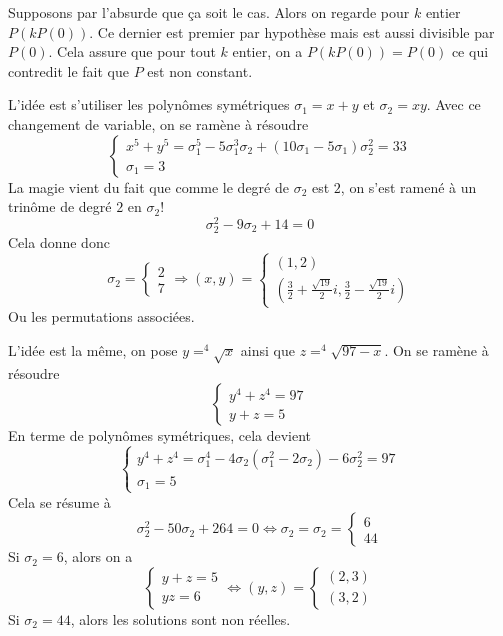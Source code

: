 \begin{sol}
Supposons par l'absurde que ça soit le cas. Alors on regarde pour $k$ entier $P(kP(0))$. Ce dernier est premier par hypothèse mais est aussi divisible par $P(0)$. Cela assure que pour tout $k$ entier, on a $P(kP(0))=P(0)$ ce qui contredit le fait que $P$ est non constant.
\end{sol}

\begin{sol}
L'idée est s'utiliser les polynômes symétriques $\sigma_1=x+y$ et $\sigma_2=xy$. Avec ce changement de variable, on se ramène à résoudre
$$\left \{
\begin{array}{rcl}
x^5+y^5=\sigma_1^5-5\sigma_1^3\sigma_2+(10\sigma_1-5\sigma_1)\sigma_2^2=33 \\
\sigma_1=3
\end{array}
\right. $$
La magie vient du fait que comme le degré de $\sigma_2$ est $2$, on s'est ramené à un trinôme de degré $2$ en $\sigma_2!$
$$\sigma_2^2-9\sigma_2+14=0 $$
Cela donne donc 
$$\sigma_2=\left \{
\begin{array}{rcl}
2 \\
7
\end{array}
\right. \Rightarrow (x,y)=\left \{
\begin{array}{rcl}
(1,2) \\
\left(\frac{3}{2}+\frac{\sqrt{19}}{2}i,\frac{3}{2}-\frac{\sqrt{19}}{2}i\right)
\end{array}
\right.$$ Ou les permutations associées.
\end{sol}

\begin{sol}
L'idée est la même, on pose $y=^4\sqrt{x}$ ainsi que $z=^4\sqrt{97-x}$. On se ramène à résoudre
$$\left\{\begin{array}{rcl}
y^4+z^4=97 \\
y+z=5
\end{array}\right.
  $$
  En terme de polynômes symétriques, cela devient 
 $$\left\{\begin{array}{rcl}
y^4+z^4=\sigma_1^4-4\sigma_2(\sigma_1^2-2\sigma_2)-6\sigma_2^2=97 \\
\sigma_1=5
\end{array}\right. $$ 
Cela se résume à 
$$\sigma_2^2-50\sigma_2+264=0\iff \sigma_2=\sigma_2=\left\{\begin{array}{rcl}
6 \\
44
\end{array}\right. $$
Si $\sigma_2=6$, alors on a 
$$ \left\{\begin{array}{rcl}
y+z=5 \\
yz=6
\end{array}\right.\iff (y,z)= \left\{\begin{array}{rcl}
(2,3) \\
(3,2)
\end{array}\right.$$
Si $\sigma_2=44$, alors les solutions sont non réelles.
\end{sol}


